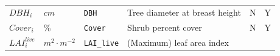 \documentclass[]{book}
\begin{document}
\begin{longtable}[]{@{}llllll@{}}
\begin{minipage}[t]{0.10\columnwidth}
\(DBH_i\)\strut
\end{minipage} & \begin{minipage}[t]{0.09\columnwidth}\raggedright\strut
\(cm\)\strut
\end{minipage} & \begin{minipage}[t]{0.06\columnwidth}\raggedright\strut
\texttt{DBH}\strut
\end{minipage} & \begin{minipage}[t]{0.43\columnwidth}\raggedright\strut
Tree diameter at breast height\strut
\end{minipage} & \begin{minipage}[t]{0.07\columnwidth}\raggedright\strut
N\strut
\end{minipage} & \begin{minipage}[t]{0.07\columnwidth}\raggedright\strut
Y\strut
\end{minipage}\tabularnewline
\begin{minipage}[t]{0.10\columnwidth}\raggedright\strut
\(Cover_i\)\strut
\end{minipage} & \begin{minipage}[t]{0.09\columnwidth}\raggedright\strut
\%\strut
\end{minipage} & \begin{minipage}[t]{0.06\columnwidth}\raggedright\strut
\texttt{Cover}\strut
\end{minipage} & \begin{minipage}[t]{0.43\columnwidth}\raggedright\strut
Shrub percent cover\strut
\end{minipage} & \begin{minipage}[t]{0.07\columnwidth}\raggedright\strut
N\strut
\end{minipage} & \begin{minipage}[t]{0.07\columnwidth}\raggedright\strut
Y\strut
\end{minipage}\tabularnewline
\begin{minipage}[t]{0.10\columnwidth}\raggedright\strut
\(LAI^{live}_i\)\strut
\end{minipage} & \begin{minipage}[t]{0.09\columnwidth}\raggedright\strut
\(m^2 \cdot m^{-2}\)\strut
\end{minipage} & \begin{minipage}[t]{0.06\columnwidth}\raggedright\strut
\texttt{LAI\_live}\strut
\end{minipage} & \begin{minipage}[t]{0.43\columnwidth}\raggedright\strut
(Maximum) leaf area index\strut

\end{minipage}
\end{longtable}
\end{document}
